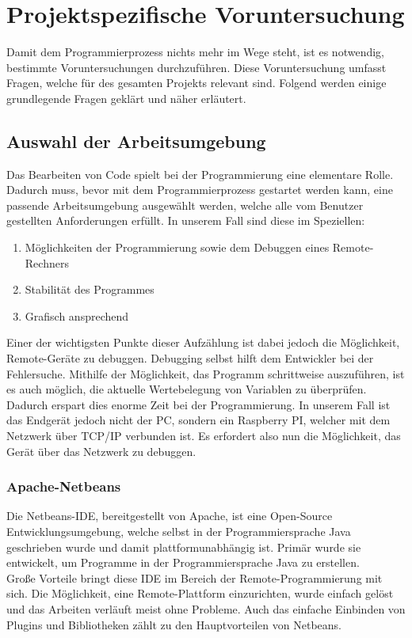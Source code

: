 \section{Projektspezifische Voruntersuchung}\label{sec:projektspezifische-voruntersuchung}
Damit dem Programmierprozess nichts mehr im Wege steht, ist es notwendig, bestimmte Voruntersuchungen durchzuführen.
Diese Voruntersuchung umfasst Fragen, welche für des gesamten Projekts relevant sind.
Folgend werden einige grundlegende Fragen geklärt und näher erläutert.
\subsection{Auswahl der Arbeitsumgebung}\label{subsec:auswahl-der-arbeitsumgebung}
Das Bearbeiten von Code spielt bei der Programmierung eine elementare Rolle.
Dadurch muss, bevor mit dem Programmierprozess gestartet werden kann, eine passende Arbeitsumgebung ausgewählt werden, welche alle vom Benutzer gestellten Anforderungen erfüllt.
In unserem Fall sind diese im Speziellen:
\begin{enumerate}
    \item Möglichkeiten der Programmierung sowie dem Debuggen eines Remote-Rechners
    \item Stabilität des Programmes
    \item Grafisch ansprechend
\end{enumerate}
Einer der wichtigsten Punkte dieser Aufzählung ist dabei jedoch die Möglichkeit, Remote-Geräte zu debuggen.
Debugging selbst hilft dem Entwickler bei der Fehlersuche.
Mithilfe der Möglichkeit, das Programm schrittweise auszuführen, ist es auch möglich, die aktuelle Wertebelegung von Variablen zu überprüfen.
Dadurch erspart dies enorme Zeit bei der Programmierung.
In unserem Fall ist das Endgerät jedoch nicht der PC, sondern ein Raspberry PI, welcher mit dem Netzwerk über TCP/IP verbunden ist.
Es erfordert also nun die Möglichkeit, das Gerät über das Netzwerk zu debuggen.
\subsubsection{Apache-Netbeans}
Die Netbeans-IDE, bereitgestellt von Apache, ist eine Open-Source Entwicklungsumgebung, welche selbst in der Programmiersprache Java geschrieben wurde und damit plattformunabhängig ist.
Primär wurde sie entwickelt, um Programme in der Programmiersprache Java zu erstellen.\\
Große Vorteile bringt diese IDE im Bereich der Remote-Programmierung mit sich.
Die Möglichkeit, eine Remote-Plattform einzurichten, wurde einfach gelöst und das Arbeiten verläuft meist ohne Probleme.
Auch das einfache Einbinden von Plugins und Bibliotheken zählt zu den Hauptvorteilen von Netbeans.

